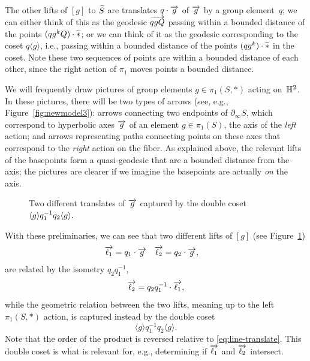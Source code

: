 The other lifts of $[g]$ to $\widetilde{S}$ are translates $q \cdot \overrightarrow{g}$
of $\overrightarrow{g}$ by a
group element~$q$; we can either think of this as the geodesic
$\overrightarrow{qgQ}$ passing within a bounded distance of the points $(qg^kQ) \cdot \widetilde{\ast}$; 
or we can think of it as the geodesic corresponding to the coset
$q\langle g\rangle$, i.e., passing within a bounded distance of the
points $(qg^k) \cdot \widetilde{\ast}$ in the coset. Note these two sequences of
points are within a
bounded distance of each other, since the right action of $\pi_1$
moves points a bounded distance.

We will frequently draw pictures of group elements $g\in\pi_1(S,\ast)$
acting on~$\mathbb{H}^2$. In these pictures, there will be two types of
arrows (see, e.g., Figure~\ref{fig:newmodel3}): arrows
connecting two endpoints of $\partial_{\infty}S$, which
correspond to hyperbolic axes $\overrightarrow{g}$ of an element
$g \in \pi_1(S)$, the axis of the \emph{left} action; and arrows
representing paths connecting points on these axes that correspond to
the \emph{right} action on the fiber. As explained above, the
relevant lifts of the basepoints form a quasi-geodesic that are a
bounded distance from the axis; the pictures are clearer if we imagine
the basepoints are actually \emph{on} the axis.

\begin{figure}
\caption{Two different translates of $\protect\overrightarrow{g}$ captured by the double coset $\protect\langle g \protect\rangle q_1^{-1} q_2 \protect\langle g \protect\rangle.$}\label{fig:doublecoset}
\end{figure}

With these preliminaries, we can see that two different lifts of
$[g]$ (see Figure~\ref{fig:doublecoset}) 
\begin{align*}
  \overrightarrow{\ell_1} &= q_1 \cdot \overrightarrow{g} & \overrightarrow{\ell_2} &= q_2 \cdot \overrightarrow{g},
\end{align*}
are related by the isometry $q_2 q_1^{-1}$,
\begin{equation}\label{eq:line-translate}
  \overrightarrow{\ell_2} = q_2 q_1^{-1} \cdot \overrightarrow{\ell_1},
\end{equation}
while the geometric relation between the two lifts, meaning up to the left
$\pi_1(S,*)$ action, is captured instead by the double coset
\begin{equation}\label{eq:double_coset}
  \langle g \rangle q_1^{-1} q_2 \langle g \rangle.
\end{equation}
Note that the order of the product is reversed relative to
\eqref{eq:line-translate}. This double coset is what is relevant for,
e.g., determining if $\overrightarrow{\ell_1}$ and $\overrightarrow{\ell_2}$ intersect.

